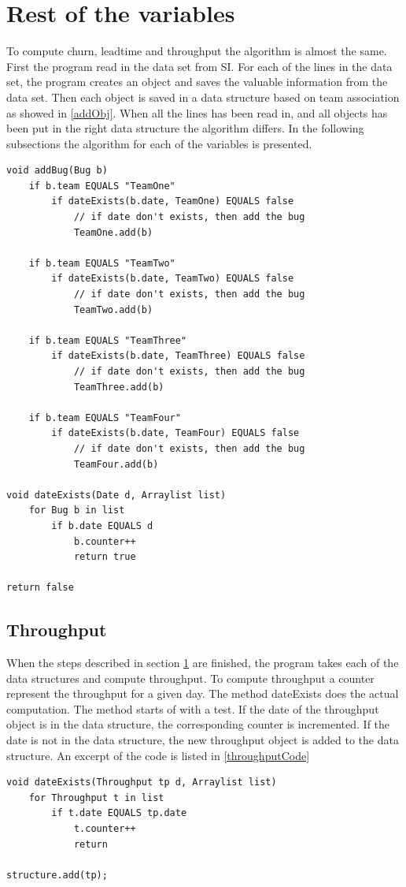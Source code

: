 \documentclass[UKenglish]{ifimaster}  %
\begin{document}
 \section{Rest of the variables}
 \label{sec:rotv}
 To compute churn, leadtime and throughput the algorithm is almost the same.  First the program read in the data set from SI. For each of the lines in the data set, the program creates an object and saves the valuable information from the data set. Then each object is saved in a data structure based on team association as showed in \ref{addObj}. When all the lines has been read in, and all objects has been put in the right data structure the algorithm differs. In the following subsections the algorithm for each of the variables is presented. 

\begin{minipage}{\textwidth}
\begin{lstlisting}[caption=Pseudocode example of how throughput objects are added, label=addObj]
void addBug(Bug b)
	if b.team EQUALS "TeamOne"
		if dateExists(b.date, TeamOne) EQUALS false
			// if date don't exists, then add the bug
			TeamOne.add(b)
			
	if b.team EQUALS "TeamTwo"
		if dateExists(b.date, TeamTwo) EQUALS false
			// if date don't exists, then add the bug
			TeamTwo.add(b)
			
	if b.team EQUALS "TeamThree"
		if dateExists(b.date, TeamThree) EQUALS false 
			// if date don't exists, then add the bug
			TeamThree.add(b)
			
	if b.team EQUALS "TeamFour"
		if dateExists(b.date, TeamFour) EQUALS false
			// if date don't exists, then add the bug
			TeamFour.add(b)
		
void dateExists(Date d, Arraylist list)
	for Bug b in list
		if b.date EQUALS d
			b.counter++
			return true
	
return false	
 \end{lstlisting}
 \end{minipage}
 
\subsection{Throughput}
 \label{sec:TP}
When the steps described in section \ref{sec:rotv} are finished, the program takes each of the data structures and compute throughput. To compute throughput a counter represent the throughput for a given day. The method dateExists  does the actual computation. The method starts of with a test. If the date of the throughput object is in the data structure, the corresponding counter is incremented.  If the date is not in the data structure, the new throughput object is added to the data structure. An excerpt of the code is listed in \ref{throughputCode}
\begin{minipage}{\textwidth}
\begin{lstlisting}[caption=Pseudocode example of how throughput is measured, label=throughputCode]
void dateExists(Throughput tp d, Arraylist list)
	for Throughput t in list
		if t.date EQUALS tp.date
			t.counter++
			return
			
structure.add(tp);
\end{lstlisting}
 \end{minipage}
\end{document}
